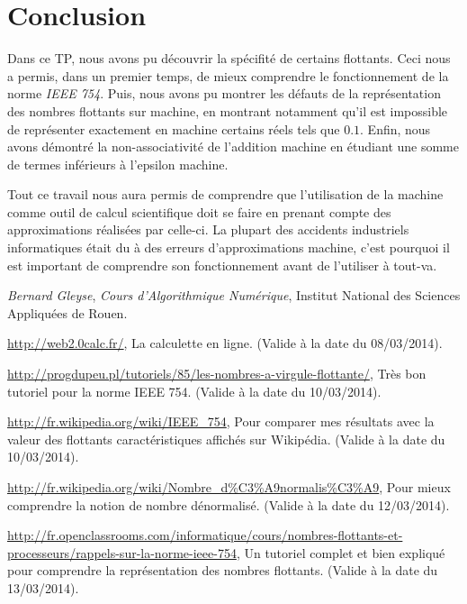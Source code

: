 \documentclass[a4paper, titlepage]{livret} %
\begin{document}
	\chapter*{Conclusion}
		Dans ce TP, nous avons pu découvrir la spécifité de certains flottants.
		Ceci nous a permis, dans un premier temps, de mieux comprendre le fonctionnement de la norme \emph{IEEE 754}.
		Puis, nous avons pu montrer les défauts de la représentation des nombres flottants sur machine, en montrant notamment qu'il est impossible de représenter exactement en machine certains réels tels que $0.1$.
		Enfin, nous avons démontré la non-associativité de l'addition machine en étudiant une somme de termes inférieurs à l'epsilon machine.

		Tout ce travail nous aura permis de comprendre que l'utilisation de la machine comme outil de calcul scientifique doit se faire en prenant compte des approximations réalisées par celle-ci.
		La plupart des accidents industriels informatiques était du à des erreurs d'approximations machine, c'est pourquoi il est important de comprendre son fonctionnement avant de l'utiliser à tout-va.


	\appendix
	
	\begin{thebibliography}{9}
	
			\emph{Bernard Gleyse},
			\textit{Cours d'Algorithmique Numérique},
			Institut National des Sciences Appliquées de Rouen.

			\url{http://web2.0calc.fr/},
			La calculette en ligne.
			(Valide à la date du 08/03/2014).

			\url{http://progdupeu.pl/tutoriels/85/les-nombres-a-virgule-flottante/},
			Très bon tutoriel pour la norme IEEE 754.
			(Valide à la date du 10/03/2014).

			\url{http://fr.wikipedia.org/wiki/IEEE_754},
			Pour comparer mes résultats avec la valeur des flottants caractéristiques affichés sur Wikipédia.
			(Valide à la date du 10/03/2014).

			\url{http://fr.wikipedia.org/wiki/Nombre_d\%C3\%A9normalis\%C3\%A9},
			Pour mieux comprendre la notion de nombre dénormalisé.
			(Valide à la date du 12/03/2014).

			\url{http://fr.openclassrooms.com/informatique/cours/nombres-flottants-et-processeurs/rappels-sur-la-norme-ieee-754},
			Un tutoriel complet et bien expliqué pour comprendre la représentation des nombres flottants.
			(Valide à la date du 13/03/2014).
	
	\end{thebibliography}
\end{document}
